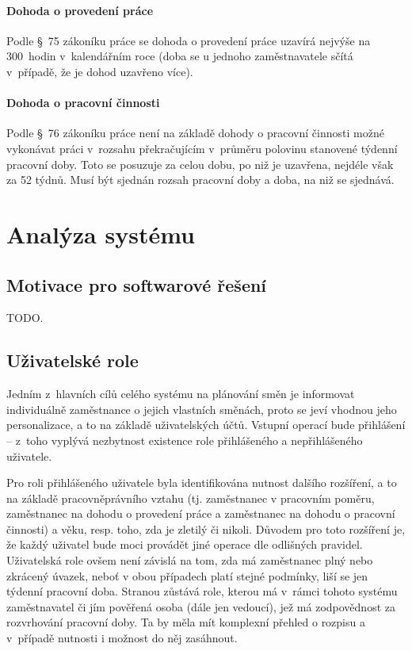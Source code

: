 \documentclass[twoside]{ctuthesis}
\begin{document}
\subsubsection{Dohoda o provedení práce}
Podle §~75 zákoníku práce se dohoda o provedení práce uzavírá nejvýše na 300~hodin v~kalendářním roce (doba se u jednoho zaměstnavatele sčítá v~případě, že je dohod uzavřeno více).

\subsubsection{Dohoda o pracovní činnosti}
Podle §~76 zákoníku práce není na základě dohody o pracovní činnosti možné vykonávat práci v~rozsahu překračujícím v~průměru polovinu stanovené týdenní pracovní doby. Toto se posuzuje za celou dobu, po niž je uzavřena, nejdéle však za 52 týdnů. Musí být sjednán rozsah pracovní doby a doba, na niž se sjednává.



\chapter{Analýza systému}


\section{Motivace pro softwarové řešení}

TODO.


\section{Uživatelské role}
Jedním z~hlavních cílů celého systému na plánování směn je informovat individuálně zaměstnance o jejich vlastních směnách, proto se jeví vhodnou jeho personalizace, a to na základě uživatelských účtů. Vstupní operací bude přihlášení -- z~toho vyplývá nezbytnost existence role přihlášeného a nepřihlášeného uživatele.

Pro roli přihlášeného uživatele byla identifikována nutnost dalšího rozšíření, a to na základě pracovněprávního vztahu (tj. zaměstnanec v pracovním poměru, zaměstnanec na dohodu o provedení práce a zaměstnanec na dohodu o pracovní činnosti) a věku, resp. toho, zda je zletilý či nikoli. Důvodem pro toto rozšíření je, že každý uživatel bude moci provádět jiné operace dle odlišných pravidel. Uživatelská role ovšem není závislá na tom, zda má zaměstnanec plný nebo zkrácený úvazek, neboť v obou případech platí stejné podmínky, liší se jen týdenní pracovní doba. Stranou zůstává role, kterou má v~rámci tohoto systému zaměstnavatel či jím pověřená osoba (dále jen vedoucí), jež má zodpovědnost za rozvrhování pracovní doby. Ta by měla mít komplexní přehled o rozpisu a v~případě nutnosti i možnost do něj zasáhnout.
\end{document}
